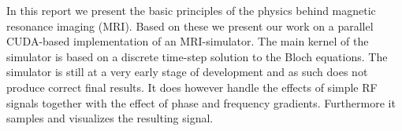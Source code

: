 

In this report we present the basic principles of the physics behind
magnetic resonance imaging (MRI). Based on these we present our work
on a parallel CUDA-based implementation of an MRI-simulator. The main
kernel of the simulator is based on a discrete time-step solution to
the Bloch equations. The simulator is still at a very early stage of
development and as such does not produce correct final results. It
does however handle the effects of simple RF signals together with the
effect of phase and frequency gradients. Furthermore it samples and
visualizes the resulting signal.

